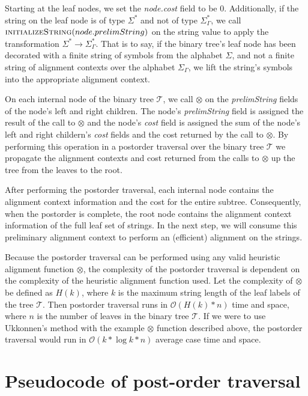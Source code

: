 \documentclass[11pt]{article}
\begin{document}
Starting at the leaf nodes, we set the \textit{node.cost} field to be $0$.
Additionally, if the string on the leaf node is of type $\Sigma^{*}$ and not of type $\Sigma^{*}_{\Gamma}$, we call $\Call{initializeString}{node.prelimString}$ on the string value to apply the transformation $\Sigma^{*} \rightarrow \Sigma^{*}_{\Gamma}$.
That is to say, if the binary tree's leaf node has been decorated with a finite string of symbols from the alphabet $\Sigma$, and not a finite string of alignment contexts over the alphabet $\Sigma_{\Gamma}$, we lift the string's symbols into the appropriate alignment context. %

On each internal node of the binary tree $\mathcal{T}$, we call $\otimes$ on the \textit{prelimString} fields of the node's left and right children.
The node's \textit{prelimString} field is assigned the result of the call to $\otimes$ and the node's  \textit{cost} field is assigned the sum of the node's left and right childern's \textit{cost} fields and the cost returned by the call to $\otimes$.
By performing this operation in a postorder traversal over the binary tree $\mathcal{T}$ we propagate the alignment contexts and cost returned from the calls to $\otimes$ up the tree from the leaves to the root.

After performing the postorder traversal, each internal node contains the alignment context information and the cost for the entire subtree.
Consequently, when the postorder is complete, the root node contains the alignment context information of the full leaf set of strings.
In the next step, we will consume this preliminary alignment context to perform an (efficient) alignment on the strings.

Because the postorder traversal can be performed using any valid heuristic alignment function $\otimes$, the complexity of the postorder traversal is dependent on the complexity of the heuristic alignment function used.
Let the complexity of $\otimes$ be defined as $H(k)$, where $k$ is the maximum string length of the leaf labels of the tree $\mathcal{T}$.
Then postorder traversal runs in $\mathcal{O}(H(k) * n)$ time and space, where $n$ is the number of leaves in the binary tree $\mathcal{T}$.
If we were to use Ukkonnen's method with the example $\otimes$ function described above, the postorder traversal would run in $\mathcal{O}(k * \log  k * n)$ average case time and space.

\section{Pseudocode of post-order traversal}
\end{document}
